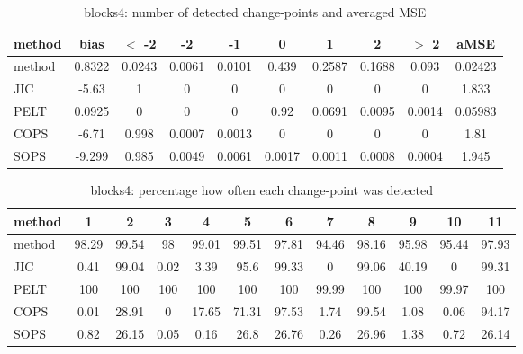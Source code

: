\begin{table}[ht]
\centering
\begin{tabular}{l|c|ccccccc|c}
  \hline
method & bias & $<$ -2 & -2 & -1 & 0 & 1 & 2 & $>$ 2 & aMSE \\ 
  \hline
method & 0.8322 & 0.0243 & 0.0061 & 0.0101 & 0.439 & 0.2587 & 0.1688 & 0.093 & 0.02423 \\ 
  JIC & -5.63 &     1 &     0 &     0 &     0 &     0 &     0 &     0 & 1.833 \\ 
  PELT & 0.0925 &     0 &     0 &     0 &  0.92 & 0.0691 & 0.0095 & 0.0014 & 0.05983 \\ 
  COPS & -6.71 & 0.998 & 0.0007 & 0.0013 &     0 &     0 &     0 &     0 &  1.81 \\ 
  SOPS & -9.299 & 0.985 & 0.0049 & 0.0061 & 0.0017 & 0.0011 & 0.0008 & 0.0004 & 1.945 \\ 
   \hline
\end{tabular}
\caption{blocks4: number of detected change-points and averaged MSE} 
\label{tab:blocks4Njumps}
\end{table}
\begin{table}[ht]
\centering
\begin{tabular}{l|ccccccccccc}
  \hline
method & 1 & 2 & 3 & 4 & 5 & 6 & 7 & 8 & 9 & 10 & 11 \\ 
  \hline
method &  98.29 &  99.54 &     98 &  99.01 &  99.51 &  97.81 &  94.46 &  98.16 &  95.98 &  95.44 &  97.93 \\ 
  JIC &   0.41 &  99.04 &   0.02 &   3.39 &   95.6 &  99.33 &      0 &  99.06 &  40.19 &      0 &  99.31 \\ 
  PELT &    100 &    100 &    100 &    100 &    100 &    100 &  99.99 &    100 &    100 &  99.97 &    100 \\ 
  COPS &   0.01 &  28.91 &      0 &  17.65 &  71.31 &  97.53 &   1.74 &  99.54 &   1.08 &   0.06 &  94.17 \\ 
  SOPS &   0.82 &  26.15 &   0.05 &   0.16 &   26.8 &  26.76 &   0.26 &  26.96 &   1.38 &   0.72 &  26.14 \\ 
   \hline
\end{tabular}
\caption{blocks4: percentage how often each change-point was detected} 
\label{tab:blocks4Detections}
\end{table}

